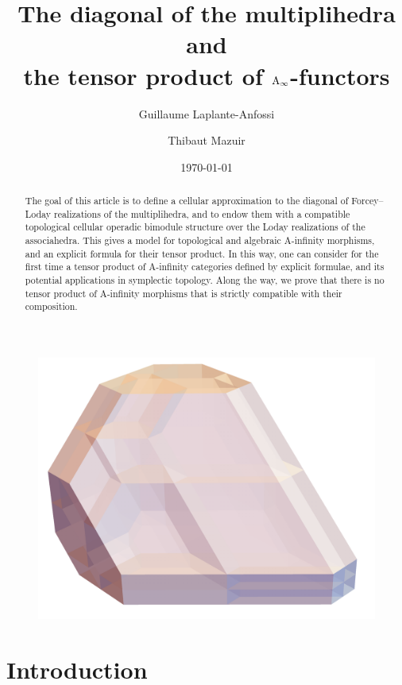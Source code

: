 \documentclass[twoside, 12pt]{amsart}
\title[The diagonal of the multiplihedra]{The diagonal of the multiplihedra and \\ the tensor product of $\mathrm{A}_\infty$-functors}
\author{Guillaume Laplante-Anfossi}
\author{Thibaut Mazuir}
\date{\today}
\theoremstyle{remark}
\begin{document}
\begin{abstract}
The goal of this article is to define a cellular approximation to the diagonal of Forcey--Loday realizations of the multiplihedra, and to endow them with a compatible topological cellular operadic bimodule structure over the Loday realizations of the associahedra. 
This gives a model for topological and algebraic A-infinity morphisms, and an explicit formula for their tensor product.
In this way, one can consider for the first time a tensor product of A-infinity categories defined by explicit formulae, and its potential applications in symplectic topology. 
Along the way, we prove that there is no tensor product of A-infinity morphisms that is strictly compatible with their composition. 
\end{abstract}

\maketitle

\begin{figure}[h!]
\centering
\includegraphics[width=0.6\linewidth]{J4.png} 
\label{Fig5:J4}
\end{figure}

\setcounter{tocdepth}{1}
\tableofcontents


\section*{Introduction}



\end{document}
